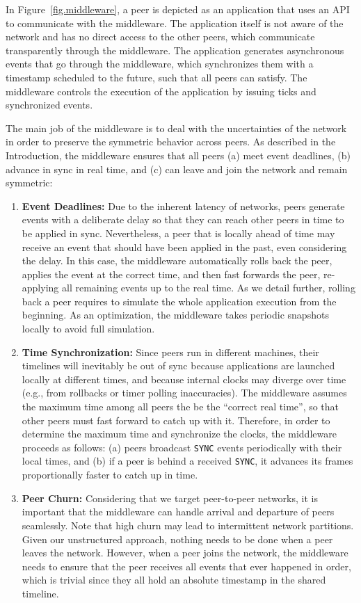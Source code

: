 \documentclass[10pt,journal,compsoc]{IEEEtran}
\newcommand{\code}[1]  {\texttt{\footnotesize{#1}}}
\begin{document}
In Figure~\ref{fig.middleware}, a peer is depicted as an application that uses
an API to communicate with the middleware.
The application itself is not aware of the network and has no direct access to
the other peers, which communicate transparently through the middleware.
The application generates asynchronous events that go through the middleware,
which synchronizes them with a timestamp scheduled to the future, such that all
peers can satisfy.
The middleware controls the execution of the application by issuing ticks and
synchronized events.

The main job of the middleware is to deal with the uncertainties of the
network in order to preserve the symmetric behavior across peers.
As described in the Introduction, the middleware ensures that all peers
    (a) meet event deadlines,
    (b) advance in sync in real time, and
    (c) can leave and join the network and remain symmetric:
%
\begin{enumerate}
\item \textbf{Event Deadlines:}
Due to the inherent latency of networks, peers generate events with a
deliberate delay so that they can reach other peers in time to be applied in
sync.
Nevertheless, a peer that is locally ahead of time may receive an event that
should have been applied in the past, even considering the delay.
In this case, the middleware automatically rolls back the peer, applies the
event at the correct time, and then fast forwards the peer, re-applying all
remaining events up to the real time.
As we detail further, rolling back a peer requires to simulate the whole
application execution from the beginning.
As an optimization, the middleware takes periodic snapshots locally to avoid
full simulation.
%
\item \textbf{Time Synchronization:}
Since peers run in different machines, their timelines will inevitably be out
of sync because applications are launched locally at different times, and
because internal clocks may diverge over time (e.g., from rollbacks or timer
polling inaccuracies).
The middleware assumes the maximum time among all peers the be the
``correct real time'', so that other peers must fast forward to catch up with
it.
Therefore, in order to determine the maximum time and synchronize the clocks,
the middleware proceeds as follows:
    (a) peers broadcast \code{SYNC} events periodically with their local
        times, and
    (b) if a peer is behind a received \code{SYNC}, it advances its frames
        proportionally faster to catch up in time.
%
\item \textbf{Peer Churn:}
Considering that we target peer-to-peer networks, it is important that the
middleware can handle arrival and departure of peers seamlessly.
Note that high churn may lead to intermittent network partitions.
Given our unstructured approach, nothing needs to be done when a peer leaves
the network.
However, when a peer joins the network, the middleware needs to ensure that the
peer receives all events that ever happened in order, which is trivial since
they all hold an absolute timestamp in the shared timeline.
\end{enumerate}
\end{document}

